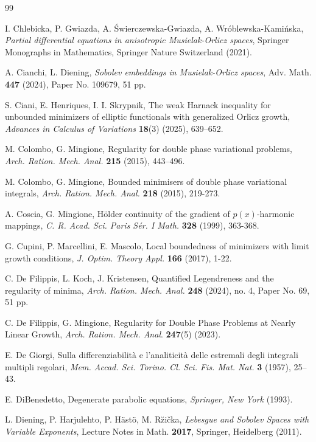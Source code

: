 \documentclass[10pt,reqno]{amsart}
\newcommand *\w{^\wedge}
\theoremstyle{definition}
\numberwithin{equation}{section}
\begin{document}
\begin{thebibliography}{99}
{ 
I. Chlebicka, P. Gwiazda, A. Świerczewska-Gwiazda, A. Wróblewska-Kamińska, 
{\it Partial differential equations in anisotropic Musielak-Orlicz spaces}, 
Springer Monographs in Mathematics, Springer Nature Switzerland (2021).

A. Cianchi, L. Diening,
{\it Sobolev embeddings in Musielak-Orlicz spaces},
Adv. Math. {\bf 447} (2024), Paper No. 109679, 51 pp.


 S. Ciani, E. Henriques, I. I. Skrypnik,  The weak Harnack inequality for unbounded minimizers of elliptic functionals with generalized Orlicz growth, \textit{Advances in Calculus of Variations} \textbf{18}(3) (2025), 639--652.


M. Colombo, G. Mingione,  
Regularity for double phase variational problems,  
{\it Arch. Ration. Mech. Anal.} \textbf{215} (2015), 443--496.

M. Colombo, G. Mingione,
Bounded minimisers of double phase variational integrals,
{\it Arch. Ration. Mech. Anal.} \textbf{218} (2015), 219-273.

A. Coscia, G. Mingione,
Hölder continuity of the gradient of $p(x)$-harmonic mappings,
{\it C. R. Acad. Sci. Paris Sér. I Math.} \textbf{328} (1999), 363-368.

G. Cupini, P. Marcellini, E. Mascolo,
Local boundedness of minimizers with limit growth conditions,
{\it J. Optim. Theory Appl.} \textbf{166} (2017), 1-22.


C. De Filippis, L. Koch, J. Kristensen,
Quantified Legendreness and the regularity of minima,
{\it Arch. Ration. Mech. Anal.} \textbf{248} (2024), no. 4, Paper No. 69, 51 pp.

 C. De Filippis, G. Mingione, Regularity for Double Phase Problems at Nearly Linear Growth, {\it Arch. Ration. Mech. Anal}. \textbf{247}(5) (2023).
 
E. De Giorgi,  
Sulla differenziabilità e l'analiticità delle estremali degli integrali multipli regolari,  
{\it Mem. Accad. Sci. Torino. Cl. Sci. Fis. Mat. Nat.} \textbf{3} (1957), 25--43.

E. DiBenedetto, Degenerate parabolic equations, \textit{Springer, New York} (1993).

L. Diening, P. Harjulehto, P. Hästö, M. R\u{z}ička, 
{\it Lebesgue and Sobolev Spaces with Variable Exponents}, 
Lecture Notes in Math. \textbf{2017}, Springer, Heidelberg (2011).

}
\end{thebibliography}
\end{document}
